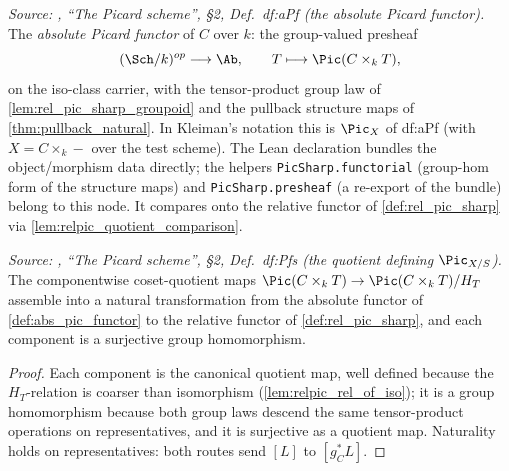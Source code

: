 \begin{definition}\leanok
  \label{def:abs_pic_functor}
  \textit{Source: \cite{kleiman-picard}, ``The Picard scheme'', \S 2, Def.~df:aPf
  (the absolute Picard functor).}
  The \emph{absolute Picard functor} of \(C\) over \(k\): the group-valued
  presheaf
  \[
    (\Sch/k)^{op} \longrightarrow \Ab, \qquad
    T \longmapsto \Pic(C \times_k T),
  \]
  on the iso-class carrier, with the tensor-product group law of
  \cref{lem:rel_pic_sharp_groupoid} and the pullback structure maps of
  \cref{thm:pullback_natural}. In Kleiman's notation this is \(\Pic_X\)
  of df:aPf (with \(X = C \times_k -\) over the test scheme). The Lean
  declaration bundles the object/morphism data directly; the helpers
  \texttt{PicSharp.functorial} (group-hom form of the structure maps) and
  \texttt{PicSharp.presheaf} (a re-export of the bundle) belong to this
  node. It compares onto the relative functor of \cref{def:rel_pic_sharp}
  via \cref{lem:relpic_quotient_comparison}.
\end{definition}

\begin{lemma}\leanok
  \label{lem:relpic_quotient_comparison}
  \textit{Source: \cite{kleiman-picard}, ``The Picard scheme'', \S 2, Def.~df:Pfs
  (the quotient defining \(\Pic_{X/S}\)).}
  The componentwise coset-quotient maps
  \(\Pic(C \times_k T) \to \Pic(C \times_k T)/H_T\) assemble into a natural
  transformation from the absolute functor of \cref{def:abs_pic_functor} to
  the relative functor of \cref{def:rel_pic_sharp}, and each
  component is a surjective group homomorphism.
\end{lemma}

\begin{proof}\leanok
  Each component is the canonical quotient map, well defined because the
  \(H_T\)-relation is coarser than isomorphism
  (\cref{lem:relpic_rel_of_iso}); it is a group homomorphism because both
  group laws descend the same tensor-product operations on representatives,
  and it is surjective as a quotient map. Naturality holds on
  representatives: both routes send \([L]\) to \([g_C^* L]\).
\end{proof}

